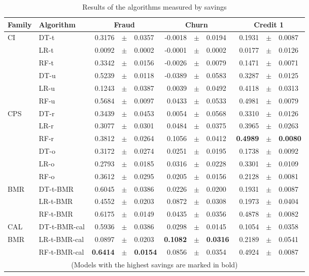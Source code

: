   \begin{table}[!b]
    \centering
    \footnotesize
    \begin{tabular}{l l r@{\hskip 0in}c@{\hskip 0in}l r@{\hskip 0in}c@{\hskip 0in}l r@{\hskip 
    0in}c@{\hskip 0in}l  } %
    \hline
    \bf{Family} & \bf{Algorithm} & \multicolumn{3}{c}{\bf{Fraud}} & 
    \multicolumn{3}{c}{\bf{Churn}} & \multicolumn{3}{c}{\bf{Credit 1}} \\ 
    \hline
CI&DT-t & 0.3176 &$\pm$& 0.0357 & -0.0018 &$\pm$& 0.0194 & 0.1931 &$\pm$& 0.0087\\ 
&LR-t & 0.0092 &$\pm$& 0.0002 & -0.0001 &$\pm$& 0.0002 & 0.0177 &$\pm$& 0.0126\\ 
&RF-t & 0.3342 &$\pm$& 0.0156 & -0.0026 &$\pm$& 0.0079 & 0.1471 &$\pm$& 0.0071\\ 
&DT-u & 0.5239 &$\pm$& 0.0118 & -0.0389 &$\pm$& 0.0583 & 0.3287 &$\pm$& 0.0125\\ 
&LR-u & 0.1243 &$\pm$& 0.0387 & 0.0039 &$\pm$& 0.0492 & 0.4118 &$\pm$& 0.0313\\ 
&RF-u & 0.5684 &$\pm$& 0.0097 & 0.0433 &$\pm$& 0.0533 & 0.4981 &$\pm$& 0.0079\\ 
\hline 
CPS&DT-r & 0.3439 &$\pm$& 0.0453 & 0.0054 &$\pm$& 0.0568 & 0.3310 &$\pm$& 0.0126\\ 
&LR-r & 0.3077 &$\pm$& 0.0301 & 0.0484 &$\pm$& 0.0375 & 0.3965 &$\pm$& 0.0263\\ 
&RF-r & 0.3812 &$\pm$& 0.0264 & 0.1056 &$\pm$& 0.0412 & \bf{0.4989} &\bf{$\pm$}& \bf{0.0080}\\ 
&DT-o & 0.3172 &$\pm$& 0.0274 & 0.0251 &$\pm$& 0.0195 & 0.1738 &$\pm$& 0.0092\\ 
&LR-o & 0.2793 &$\pm$& 0.0185 & 0.0316 &$\pm$& 0.0228 & 0.3301 &$\pm$& 0.0109\\ 
&RF-o & 0.3612 &$\pm$& 0.0295 & 0.0205 &$\pm$& 0.0156 & 0.2128 &$\pm$& 0.0081\\ 
\hline 
BMR&DT-t-BMR & 0.6045 &$\pm$& 0.0386 & 0.0226 &$\pm$& 0.0200 & 0.1931 &$\pm$& 0.0087\\ 
&LR-t-BMR & 0.4552 &$\pm$& 0.0203 & 0.0872 &$\pm$& 0.0308 & 0.1973 &$\pm$& 0.0404\\ 
&RF-t-BMR & 0.6175 &$\pm$& 0.0149 & 0.0435 &$\pm$& 0.0356 & 0.4878 &$\pm$& 0.0082\\ 
\hline 
CAL&DT-t-BMR-cal & 0.5936 &$\pm$& 0.0386 & 0.0298 &$\pm$& 0.0145 & 0.1054 &$\pm$& 0.0358\\ 
BMR&LR-t-BMR-cal & 0.0897 &$\pm$& 0.0203 & \bf{0.1082} &\bf{$\pm$}& \bf{0.0316} & 0.2189 &$\pm$& 
0.0541\\ 
&RF-t-BMR-cal & \bf{0.6414} &\bf{$\pm$}& \bf{0.0154} & 0.0856 &$\pm$& 0.0354 & 0.4924 &$\pm$& 
0.0087\\  
\hline
  \multicolumn{11}{c}{(Models with the highest savings are marked in bold)}
  \end{tabular}
    \caption{Results of the algorithms measured by savings}
    \label{tab:6:results_savings}
  \end{table}
  
